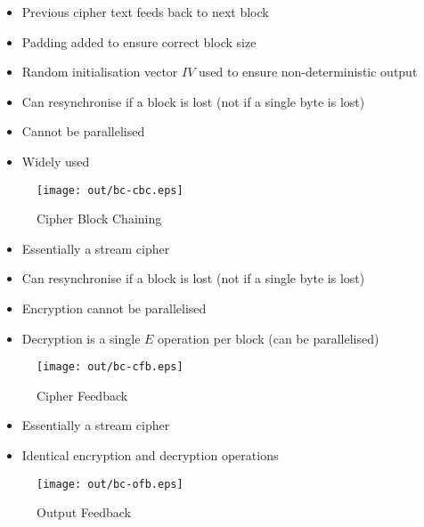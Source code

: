 \documentclass[a4paper]{article}
\begin{document}

\begin{itemize}
  \item Previous cipher text feeds back to next block
  \item Padding added to ensure correct block size
  \item Random initialisation vector $IV$ used to ensure non-deterministic
        output
  \item Can resynchronise if a block is lost (not if a single byte is lost)
  \item Cannot be parallelised
  \item Widely used
\end{itemize}

\begin{figure}[h!]
  \centering
  \texttt{[image: out/bc-cbc.eps]}
  \caption{Cipher Block Chaining}
  \label{fig:bc-cbc}
\end{figure}
\FloatBarrier


\begin{itemize}
  \item Essentially a stream cipher
  \item Can resynchronise if a block is lost (not if a single byte is lost)
  \item Encryption cannot be parallelised
  \item Decryption is a single $E$ operation per block (can be parallelised)
\end{itemize}

\begin{figure}[h!]
  \centering
  \texttt{[image: out/bc-cfb.eps]}
  \caption{Cipher Feedback}
  \label{fig:bc-cfb}
\end{figure}
\FloatBarrier


\begin{itemize}
  \item Essentially a stream cipher
  \item Identical encryption and decryption operations
\end{itemize}

\begin{figure}[h!]
  \centering
  \texttt{[image: out/bc-ofb.eps]}
  \caption{Output Feedback}
  \label{fig:bc-ofc}
\end{figure}
\FloatBarrier
\end{document}
